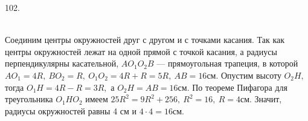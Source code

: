 102. \begin{figure}[ht!]
\end{figure}\\
Соединим центры окружностей друг с другом и с точками касания. Так как центры окружностей лежат на одной прямой с точкой касания, а радиусы перпендикулярны касательной, $AO_1O_2B$ --- прямоугольная трапеция, в которой $AO_1=4R,\ BO_2=R,\ O_1O_2=4R+R=5R,\ AB=16$см. Опустим высоту $O_2H,$ тогда $O_1H=4R-R=3R,$ а $O_2H=AB=16$см. По теореме Пифагора для треугольника $O_1HO_2$ имеем $25R^2=9R^2+256,\ R^2=16,\ R=4$см. Значит, радиусы окружностей равны 4 см и $4\cdot4=16$см.\\
